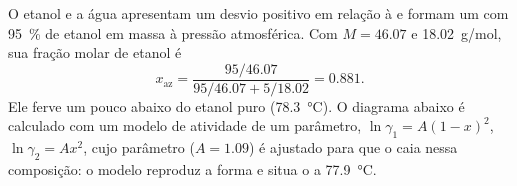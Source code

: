 \begin{example}\label{ex:b2:liquid-vapour-diagrams:ethanol-water}
O etanol e a água apresentam um desvio positivo em relação à  e
formam um  com 95~\% de etanol em massa à pressão atmosférica. Com
$M = 46.07$ e \qty{18.02}{g/mol}, sua fração molar de etanol é
\[
  x_{\text{az}} = \frac{95/46.07}{95/46.07 + 5/18.02} = 0.881 .
\]
Ele ferve um pouco abaixo do etanol puro (\qty{78.3}{\degreeCelsius}). O
diagrama abaixo é calculado com um modelo de atividade de um parâmetro, $\ln\gamma_1 = A(1 -
x)^2$, $\ln\gamma_2 = Ax^2$, cujo parâmetro ($A = 1.09$) é ajustado para que o
 caia nessa composição: o modelo reproduz a forma e situa o
 a \qty{77.9}{\degreeCelsius}.
\end{example}

